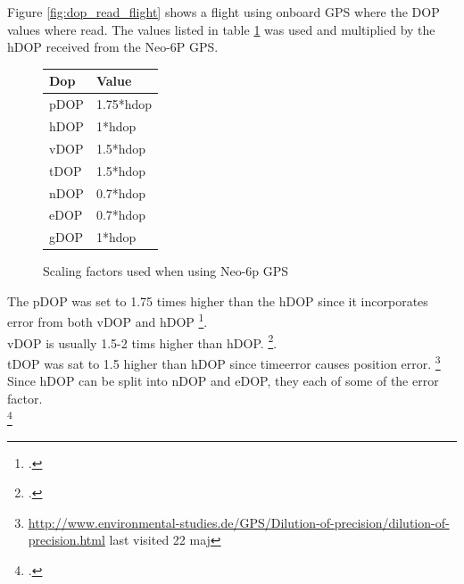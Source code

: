 \newpage
Figure \ref{fig:dop_read_flight} shows a flight using onboard GPS where the DOP values where read. The values listed in table \ref{tab:DOP} was used and multiplied by the hDOP received from the Neo-6P GPS. 
\begin{figure}
 \begin{center}
	\caption{Scaling factors used when using Neo-6p GPS}
	\label{tab:DOP}
	\begin{tabular}{@{}|l|l|@{}}
	\toprule
	Dop  & Value     \\ \midrule
	pDOP & 1.75*hdop \\ \midrule
	hDOP & 1*hdop    \\ \midrule
	vDOP & 1.5*hdop  \\ \midrule
	tDOP & 1.5*hdop  \\ \midrule
	nDOP & 0.7*hdop  \\ \midrule
	eDOP & 0.7*hdop  \\ \midrule
	gDOP & 1*hdop    \\ \bottomrule
	\end{tabular}
  \end{center}
\end{figure}

The pDOP was set to 1.75 times higher than the hDOP since it incorporates error from both vDOP and hDOP \footcite{kelddueholmmikkellaurentziusannab.o.jensen2015}. \\
vDOP is usually 1.5-2 tims higher than hDOP.  \footcite{kelddueholmmikkellaurentziusannab.o.jensen2015}. \\
tDOP was sat to 1.5 higher than hDOP since timeerror causes position error. \footnote{\url{http://www.environmental-studies.de/GPS/Dilution-of-precision/dilution-of-precision.html} last visited 22 maj} \\
Since hDOP can be split into nDOP and eDOP, they each of some of the error factor. \\
 \footcite{kelddueholmmikkellaurentziusannab.o.jensen2015}




